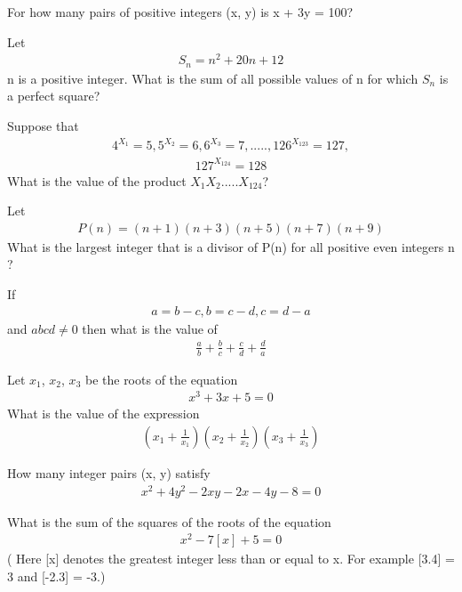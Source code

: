 \item For how many pairs of positive integers (x, y) is x + 3y = 100?

\item Let 
\begin{align*}
S_{n} = n^2 + 20n + 12
\end{align*}
n is a positive integer. What is the sum of all possible values of n for which $S_{n}$ is a perfect square?

\item Suppose that 
\begin{align*}
4^{{X}_{1}}=5, 5^{{X}_{2}}=6, 6^{{X}_{3}}=7,.....,126^{{X}_{123}}=127, 
\end{align*}
\begin{align*}
127^{{X}_{124}}=128
\end{align*}
What is the value of the product $X_{1}X_{2}.....X_{124}$?

\item Let 
\begin{align*}
P(n) = (n + 1)(n + 3)(n + 5)(n + 7)(n + 9)
\end{align*}
What is the largest integer that is a divisor of P(n) for all positive even integers n ?

\item If 
\begin{align*}
a = b - c, b = c - d, c = d - a
\end{align*}
and $abcd \neq 0$ then what is the value of 
\begin{align*}
\frac{a}{b} + \frac{b}{c} + \frac{c}{d} + \frac{d}{a}
\end{align*}

\item Let $x_{1}$, $x_{2}$, $x_{3}$ be the roots of the equation 
\begin{align*}
x^3 + 3x + 5 = 0
\end{align*}
What is the value of the expression 
\begin{align*}
(x_{1} + \frac{1}{x_{1}}) (x_{2} + \frac{1}{x_{2}}) (x_{3} + \frac{1}{x_{3}})
\end{align*}

\item How many integer pairs (x, y) satisfy 
\begin{align}
x^2 + 4y^2 - 2xy - 2x - 4y - 8 = 0
\end{align}

\item What is the sum of the squares of the roots of the equation 
\begin{align}
x^2 - 7[x] + 5 = 0
\end{align}
( Here [x] denotes the greatest integer less than or equal to x. For example [3.4] = 3 and [-2.3] = -3.)





